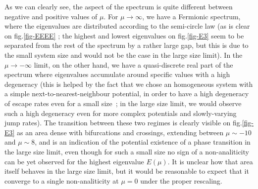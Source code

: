 \documentclass[aps,pre,onecolumn,showpacs,showkeys,a4paper]{revtex4-1}
\begin{document}
As we can clearly see, the aspect of the spectrum is quite different between negative and positive values of $\mu$. For $\mu\rightarrow\infty$, we have a Fermionic spectrum, where the eigenvalues are distributed according to the semi-circle law (as is clear on fig.\ref{fig-EEEE} ; the highest and lowest eigenvalues on fig.\ref{fig-E3} seem to be separated from the rest of the spectrum by a rather large gap, but this is due to the small system size and would not be the case in the large size limit). In the $\mu\rightarrow-\infty$ limit, on the other hand, we have a quasi-discrete real part of the spectrum where eigenvalues accumulate around specific values with a high degeneracy (this is helped by the fact that we chose an homogeneous system with a simple next-to-nearest-neighbour potential, in order to have a high degeneracy of escape rates even for a small size~; in the large size limit, we would observe such a high degeneracy even for more complex potentials and slowly-varying jump rates). The transition between these two regimes is clearly visible on fig.\ref{fig-E3} as an area dense with bifurcations and crossings, extending between $\mu\sim-10$ and $\mu\sim8$, and is an indication of the potential existence of a phase transition in the large size limit, even though for such a small size no sign of a non-analiticity can be yet observed for the highest eigenvalue $E(\mu)$. It is unclear how that area itself behaves in the large size limit, but it would be reasonable to expect that it converge to a single non-analiticity at $\mu=0$ under the proper rescaling.

~
\end{document}
